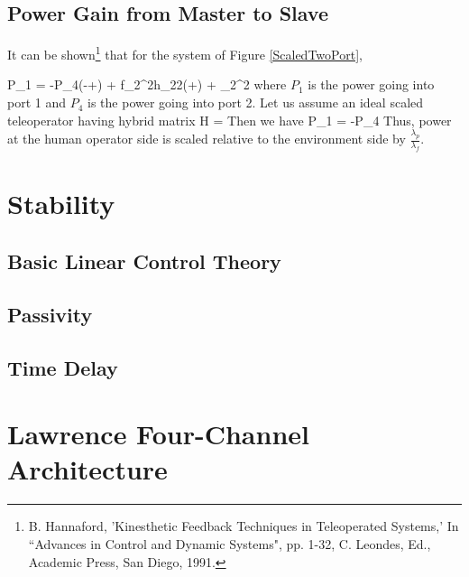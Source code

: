 
\subsection{Power Gain from Master to Slave}

It can be shown\footnote{ B. Hannaford,  'Kinesthetic Feedback Techniques in Teleoperated Systems,'  In ``Advances in Control and Dynamic Systems", pp. 1-32, C. Leondes, Ed., Academic Press, San Diego, 1991.} that for the system of Figure \ref{ScaledTwoPort},

\bq
P_1 = -P_4\left(-+\right)
     + f_2^2h_{22}\left(+\right)
     + _2^2
\eq
where $P_1$ is the power going into port 1 and $P_4$ is the power going into port 2.
Let us assume an ideal scaled teleoperator having hybrid matrix
\bq
H = 
\eq
Then we have
\bq
P_1 = -P_4
\eq
Thus, power at the human operator side is scaled relative to the environment side by $\frac{\lambda_p}{\lambda_f}$.




\section{Stability}
\subsection{Basic Linear Control Theory}
\subsection{Passivity}
\subsection{Time Delay}


\section{Lawrence Four-Channel Architecture}


